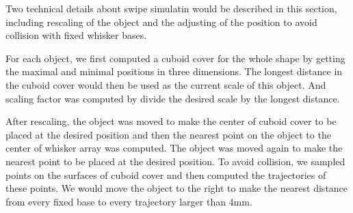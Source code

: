 Two technical details about swipe simulatin would be described in this section, including rescaling of the object and the adjusting of the position to avoid collision with fixed whisker bases.

For each object, we first computed a cuboid cover for the whole shape by getting the maximal and minimal positions in three dimensions. 
The longest distance in the cuboid cover would then be used as the current scale of this object. 
And scaling factor was computed by divide the desired scale by the longest distance. 

After rescaling, the object was moved to make the center of cuboid cover to be placed at the desired position and then the nearest point on the object to the center of whisker array was computed.
The object was moved again to make the nearest point to be placed at the desired position.
To avoid collision, we sampled points on the surfaces of cuboid cover and then computed the trajectories of these points. 
We would move the object to the right to make the nearest distance from every fixed base to every trajectory larger than 4mm.
